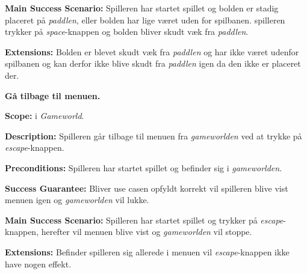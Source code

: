 \textbf{Main Success Scenario:}\newline
Spilleren har startet spillet og bolden er stadig placeret på \textit{paddlen}, eller bolden har lige været uden for spilbanen. spilleren trykker på \textit{space}-knappen og bolden bliver skudt væk fra \textit{paddlen}.\newline

\textbf{Extensions:}\newline
Bolden er blevet skudt væk fra \textit{paddlen} og har ikke været udenfor spilbanen og kan derfor ikke blive skudt fra \textit{paddlen} igen da den ikke er placeret der.\newline \newline


\textbf{Gå tilbage til menuen.}\newline

\textbf{Scope:}\newline
i \textit{Gameworld}.\newline

\textbf{Description:} \newline
Spilleren går tilbage til menuen fra \textit{gameworlden} ved at trykke på \textit{escape}-knappen.\newline

\textbf{Preconditions:}\newline
Spilleren har startet spillet og befinder sig i \textit{gameworlden}.\newline

\textbf{Success Guarantee:}\newline
Bliver use casen opfyldt korrekt vil spilleren blive vist menuen igen og \textit{gameworlden} vil lukke.\newline

\textbf{Main Success Scenario:}\newline
Spilleren har startet spillet og trykker på \textit{escape}-knappen, herefter vil menuen blive vist og \textit{gameworlden} vil stoppe. \newline

\textbf{Extensions:}\newline
Befinder spilleren sig allerede i menuen vil \textit{escape}-knappen ikke have nogen effekt.\newline